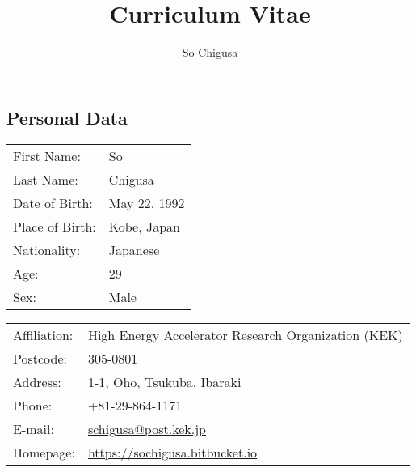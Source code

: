 \documentclass[12pt]{article}
\title{\vspace{-2cm}\textbf{Curriculum Vitae}}
\author{So Chigusa}
\begin{document}
\large
\maketitle

\newcommand{\lsim}{\stackrel{<}{_\sim}}
\newcommand{\gsim}{\stackrel{>}{_\sim}}

\newcommand{\rem}[1]{{$\spadesuit$\bf #1$\spadesuit$}}


\renewcommand{\thefootnote}{\arabic{footnote})}
\setcounter{footnote}{0}

\vspace{-5mm}
\subsection*{Personal Data}

\vspace{-3mm}

\begin{table}[h]
 \begin{tabular}{ll}
  First Name: & So %
      \\
  Last Name: & Chigusa %
      \\
  Date of Birth: & May 22, 1992 \\
  Place of Birth: & Kobe, Japan \\
  Nationality: & Japanese \\
  Age: & 29 \\
  Sex: & Male \\
 \end{tabular}
\end{table}

\vspace{-5mm}
\begin{table}[h]
 \begin{tabular}{ll}
  Affiliation: & High Energy Accelerator Research Organization (KEK) \\
  Postcode: & 305-0801 \\
  Address: & 1-1, Oho, Tsukuba, Ibaraki \\
  Phone: & +81-29-864-1171 \\
  E-mail: &
      \href{mailto:schigusa@post.kek.jp}{schigusa@post.kek.jp}
      \\
  Homepage: & \url{https://sochigusa.bitbucket.io} \\
 \end{tabular}
\end{table}
\vspace{-5mm}
\end{document}
